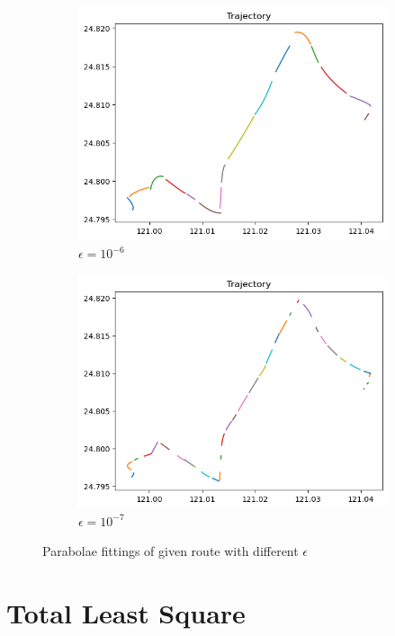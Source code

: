 \documentclass[12pt, a4paper]{article}
\begin{document}
\begin{figure}[htbp]
\begin{subfigure}{.45\linewidth}
\includegraphics[width=\linewidth]{q4_c}
\caption{$\epsilon=10^{-6}$}
\end{subfigure}
\begin{subfigure}{.45\linewidth}
\includegraphics[width=\linewidth]{q4_d}
\caption{$\epsilon=10^{-7}$}
\end{subfigure}
\caption{Parabolae fittings of given route with different $\epsilon$}
\label{fig:q4_p}
\end{figure}

\section{Total Least Square}
\end{document}
